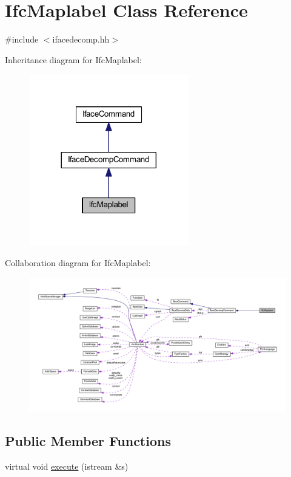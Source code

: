 \hypertarget{class_ifc_maplabel}{}\section{Ifc\+Maplabel Class Reference}
\label{class_ifc_maplabel}


{\ttfamily \#include $<$ifacedecomp.\+hh$>$}



Inheritance diagram for Ifc\+Maplabel\+:
\nopagebreak
\begin{figure}[H]
\begin{center}
\leavevmode
\includegraphics[width=197pt]{class_ifc_maplabel__inherit__graph}
\end{center}
\end{figure}


Collaboration diagram for Ifc\+Maplabel\+:
\nopagebreak
\begin{figure}[H]
\begin{center}
\leavevmode
\includegraphics[width=350pt]{class_ifc_maplabel__coll__graph}
\end{center}
\end{figure}
\subsection*{Public Member Functions}
\begin{DoxyCompactItemize}
\item 
virtual void \mbox{\hyperlink{class_ifc_maplabel_a14a4b538cfef0467342d45812b5dfbdd}{execute}} (istream \&s)
\end{DoxyCompactItemize}
